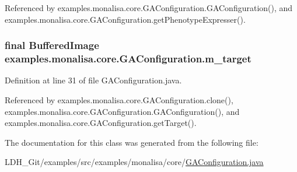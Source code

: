Referenced by examples.\-monalisa.\-core.\-G\-A\-Configuration.\-G\-A\-Configuration(), and examples.\-monalisa.\-core.\-G\-A\-Configuration.\-get\-Phenotype\-Expresser().

\hypertarget{classexamples_1_1monalisa_1_1core_1_1_g_a_configuration_a91d27add7f968f4256948bbc16c22e7a}{
\subsubsection[{m\-\_\-target}]{\setlength{\rightskip}{0pt plus 5cm}final Buffered\-Image examples.\-monalisa.\-core.\-G\-A\-Configuration.\-m\-\_\-target\hspace{0.3cm}{\ttfamily [private]}}}\label{classexamples_1_1monalisa_1_1core_1_1_g_a_configuration_a91d27add7f968f4256948bbc16c22e7a}


Definition at line 31 of file G\-A\-Configuration.\-java.



Referenced by examples.\-monalisa.\-core.\-G\-A\-Configuration.\-clone(), examples.\-monalisa.\-core.\-G\-A\-Configuration.\-G\-A\-Configuration(), and examples.\-monalisa.\-core.\-G\-A\-Configuration.\-get\-Target().



The documentation for this class was generated from the following file\-:\begin{DoxyCompactItemize}
\item 
L\-D\-H\-\_\-\-Git/examples/src/examples/monalisa/core/\hyperlink{_g_a_configuration_8java}{G\-A\-Configuration.\-java}\end{DoxyCompactItemize}
